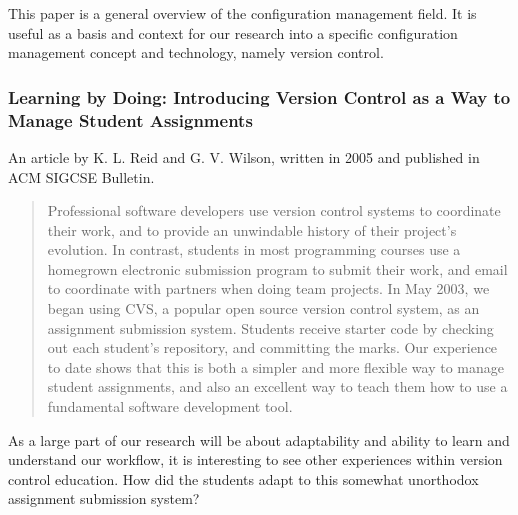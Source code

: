 \documentclass{article}
\begin{document}
This paper is a general overview of the configuration management field. It
is useful as a basis and context for our research into a specific
configuration management concept and technology, namely version control.

\subsubsection{Learning by Doing: Introducing Version Control as a Way to
               Manage Student Assignments}

An article by K. L. Reid and G. V. Wilson, written in 2005 and published in
ACM SIGCSE Bulletin\cite{reid05}.

\begin{abstract}
 Professional software developers use version control systems to coordinate
 their work, and to provide an unwindable history of their project's
 evolution. In contrast, students in most programming courses use a
 homegrown electronic submission program to submit their work, and email to
 coordinate with partners when doing team projects. In May 2003, we began
 using CVS, a popular open source version control system, as an assignment
 submission system. Students receive starter code by checking out each
 student's repository, and committing the marks. Our experience to date
 shows that this is both a simpler and more flexible way to manage student
 assignments, and also an excellent way to teach them how to use a
 fundamental software development tool.
\end{abstract}

As a large part of our research will be about adaptability and ability to
learn and understand our workflow, it is interesting to see other
experiences within version control education. How did the students adapt to
this somewhat unorthodox assignment submission system?

 

\end{document}
